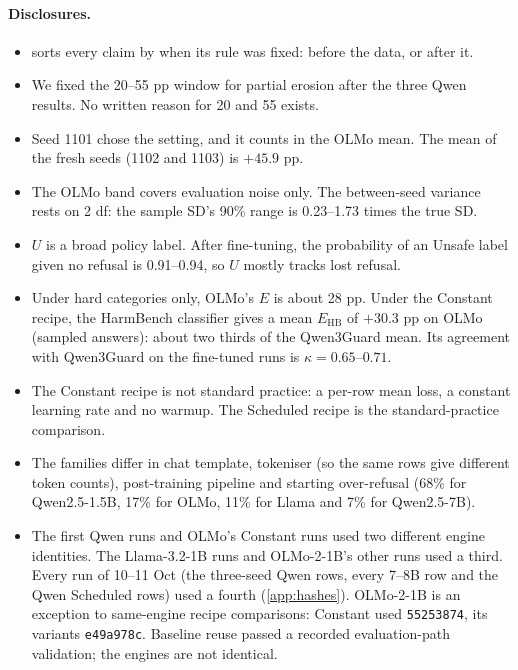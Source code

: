\documentclass{article}
\newcommand{\Ehb}{E_{\mathrm{HB}}}
\begin{document}
\paragraph{Disclosures.}
\begin{itemize}
  \item {} sorts every claim by when its rule was fixed: before
        the data, or after it.
  \item We fixed the 20--55 pp window for partial erosion after the three Qwen
        results. No written reason for 20 and 55 exists.
  \item Seed 1101 chose the setting, and it counts in the OLMo mean. The mean
        of the fresh seeds (1102 and 1103) is $+45.9$ pp.
  \item The OLMo band covers evaluation noise only. The between-seed variance
        rests on 2 df: the sample SD's 90\% range is 0.23--1.73 times the true
        SD.
  \item $U$ is a broad policy label. After fine-tuning, the probability of an
        Unsafe label given no refusal is 0.91--0.94, so $U$ mostly tracks lost
        refusal.
  \item Under hard categories only, OLMo's $E$ is about 28 pp. Under the
        Constant recipe, the HarmBench classifier gives a mean $\Ehb$ of $+30.3$
        pp on OLMo (sampled answers): about two thirds of the Qwen3Guard mean.
        Its agreement with Qwen3Guard on the fine-tuned runs is
        $\kappa = 0.65$--$0.71$.
  \item The Constant recipe is not standard practice: a per-row mean loss, a
        constant learning rate and no warmup. The Scheduled recipe is the
        standard-practice comparison.
  \item The families differ in chat template, tokeniser (so the same rows give
        different token counts), post-training pipeline and starting
        over-refusal (68\% for Qwen2.5-1.5B, 17\% for OLMo, 11\% for Llama and
        7\% for Qwen2.5-7B).
  \item The first Qwen runs and OLMo's Constant runs used two different engine
        identities. The Llama-3.2-1B runs and OLMo-2-1B's other runs used a
        third. Every run of 10--11 Oct (the three-seed Qwen rows, every 7--8B
        row and the Qwen Scheduled rows) used a fourth (\cref{app:hashes}).
        OLMo-2-1B is an exception to same-engine recipe comparisons: Constant
        used \texttt{55253874}, its variants \texttt{e49a978c}. Baseline reuse
        passed a recorded evaluation-path validation; the engines are not identical.

\end{itemize}
\end{document}
